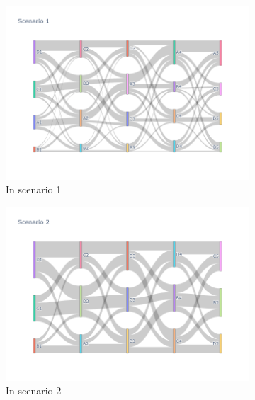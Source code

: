 \begin{figure}[h]
  \begin{subfigure}{0.5\textwidth}
    \centering
    \includegraphics[width=\textwidth]{Figure/Figure26a.jpg}
    \caption{In scenario 1}
    \label{fig26a}
  \end{subfigure}
  \begin{subfigure}{0.5\textwidth}
    \centering
    \includegraphics[width=\linewidth]{Figure/Figure26b.jpg}
    \caption{In scenario 2}
    \label{fig26b}
  \end{subfigure}
  \begin{subfigure}{0.5\textwidth}
    \centering

\end{subfigure}
\end{figure}
